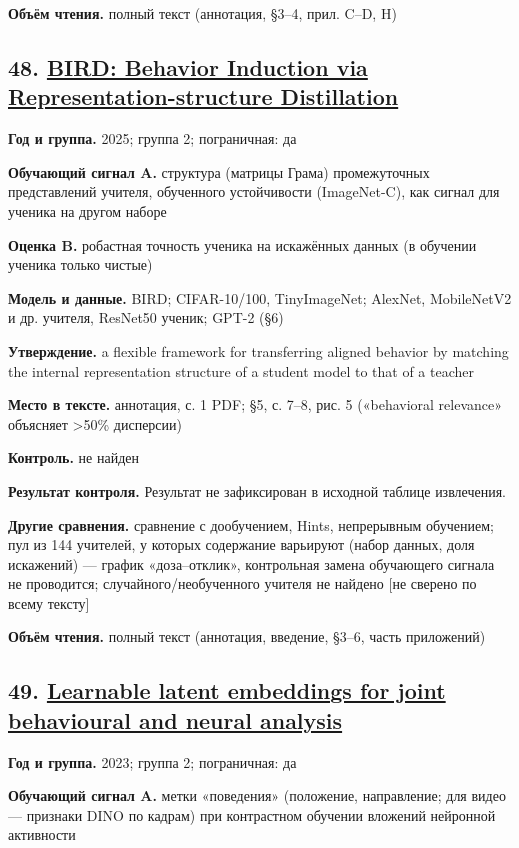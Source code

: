 \textbf{Объём чтения.} полный текст (аннотация, §3–4, прил. C–D, H)


\subsection*{48. \href{https://doi.org/10.48550/arxiv.2505.23933}{BIRD: Behavior Induction via Representation-structure Distillation}}

\textbf{Год и группа.} 2025; группа 2; пограничная: да

\textbf{Обучающий сигнал A.} структура (матрицы Грама) промежуточных представлений учителя, обученного устойчивости (ImageNet-C), как сигнал для ученика на другом наборе

\textbf{Оценка B.} робастная точность ученика на искажённых данных (в обучении ученика только чистые)

\textbf{Модель и данные.} BIRD; CIFAR-10/100, TinyImageNet; AlexNet, MobileNetV2 и др. учителя, ResNet50 ученик; GPT-2 (§6)

\textbf{Утверждение.} a flexible framework for transferring aligned behavior by matching the internal representation structure of a student model to that of a teacher

\textbf{Место в тексте.} аннотация, с. 1 PDF; §5, с. 7–8, рис. 5 («behavioral relevance» объясняет >50\% дисперсии)

\textbf{Контроль.} не найден

\textbf{Результат контроля.} Результат не зафиксирован в исходной таблице извлечения.

\textbf{Другие сравнения.} сравнение с дообучением, Hints, непрерывным обучением; пул из 144 учителей, у которых содержание варьируют (набор данных, доля искажений) — график «доза–отклик», контрольная замена обучающего сигнала не проводится; случайного/необученного учителя не найдено [не сверено по всему тексту]

\textbf{Объём чтения.} полный текст (аннотация, введение, §3–6, часть приложений)


\subsection*{49. \href{https://doi.org/10.1038/s41586-023-06031-6}{Learnable latent embeddings for joint behavioural and neural analysis}}

\textbf{Год и группа.} 2023; группа 2; пограничная: да

\textbf{Обучающий сигнал A.} метки «поведения» (положение, направление; для видео — признаки DINO по кадрам) при контрастном обучении вложений нейронной активности

